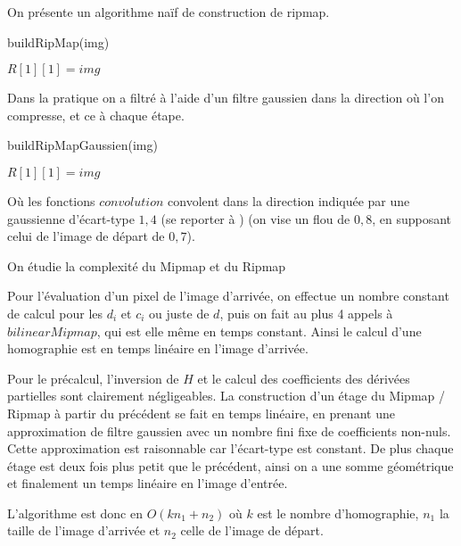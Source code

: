 
On présente un algorithme naïf de construction de ripmap.
\medbreak
\medbreak
\begin{algorithm}[H]
\caption{buildRipMap(img)}
$R[1][1] = img$\;

\end{algorithm}
\medbreak
\medbreak
Dans la pratique on a filtré à l'aide d'un filtre gaussien dans la direction où l'on compresse, et ce à chaque étape.
\medbreak
\medbreak
\begin{algorithm}[H]
\caption{buildRipMapGaussien(img)}
$R[1][1] = img$\;

\end{algorithm}
\medbreak
\medbreak
Où les fonctions $convolution$ convolent dans la direction indiquée par une gaussienne d'écart-type $1,4$ (se reporter à \cite{morel2011sift}) (on vise un flou de $0,8$, en supposant celui de l'image de départ de $0,7$).


On étudie la complexité du Mipmap et du Ripmap

Pour l'évaluation d'un pixel de l'image d'arrivée, on effectue un nombre constant de calcul pour les $d_i$ et $c_i$ ou juste de $d$, puis on fait au plus 4 appels à $bilinearMipmap$, qui est elle même en temps constant. Ainsi le calcul d'une homographie est en temps linéaire en l'image d'arrivée.

Pour le précalcul, l'inversion de $H$ et le calcul des coefficients des dérivées partielles sont clairement négligeables. La construction d'un étage du Mipmap / Ripmap à partir du précédent se fait en temps linéaire, en prenant une approximation de filtre gaussien avec un nombre fini fixe de coefficients non-nuls. Cette approximation est raisonnable car l'écart-type est constant. De plus chaque étage est deux fois plus petit que le précédent, ainsi on a une somme géométrique et finalement un temps linéaire en l'image d'entrée.

L'algorithme est donc en $O(k n_1 + n_2)$ où $k$ est le nombre d'homographie, $n_1$ la taille de l'image d'arrivée et $n_2$ celle de l'image de départ.



